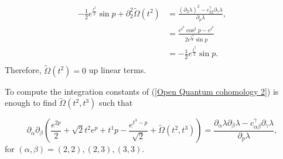\documentclass{article}
\theoremstyle{definition}
\begin{document}
 \begin{equation}
 \begin{split}
-\frac{1}{2}e^{\frac{t^2}{2}}\sin p+\partial^2_{2}\tilde\Omega(t^2)&= \frac{ (\partial_2\lambda)^2 -c_{22}^{\gamma}\partial_{\gamma}\lambda}{ \partial_{p}\lambda},\\
&=\frac{ e^{t^2}\cos^2p -e^{t^2}}{2e^{\frac{t^2}{2}}\sin p }   \\
&=  -\frac{1}{2}e^{\frac{t^2}{2}}\sin p . \\
\end{split}
\end{equation}
Therefore, $\tilde\Omega(t^2)=0$ up linear terms.


To compute the integration constants of (\ref{Open Quantum cohomology 2}) is enough to find  $\tilde\Omega(t^2,t^3) $ such that 

 \begin{equation*}
\partial_{\alpha}\partial_{\beta}\left(\frac{e^{2p}}{2}+\sqrt{2}t^2e^p+t^1p-\frac{e^{t^3-p}}{\sqrt{2}}+\tilde\Omega(t^2,t^3)   \right)= \frac{ \partial_{\alpha}\lambda \partial_{\beta}\lambda -c_{\alpha\beta}^{\gamma}\partial_{\gamma}\lambda}{ \partial_{p}\lambda},
\end{equation*}
for $(\alpha,\beta)=(2,2),(2,3),(3,3)$.



\end{document}
